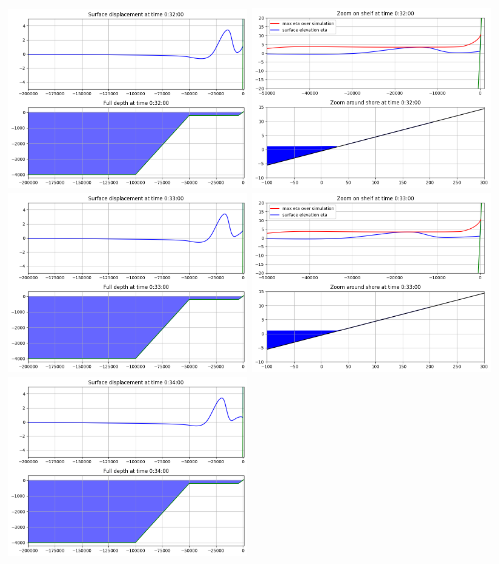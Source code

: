 \documentclass[11pt]{article}
\begin{document}
\vskip 10pt 
\includegraphics[width=0.475\textwidth]{frame0032fig0.png}
\includegraphics[width=0.475\textwidth]{frame0032fig1.png}
\vskip 10pt 
\includegraphics[width=0.475\textwidth]{frame0033fig0.png}
\includegraphics[width=0.475\textwidth]{frame0033fig1.png}
\vskip 10pt 
\includegraphics[width=0.475\textwidth]{frame0034fig0.png}
\end{document}
